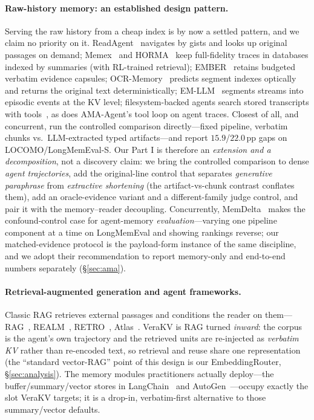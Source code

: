 \documentclass{article} %
\newcommand{\pp}{\,\mathrm{pp}}
\newcommand{\kvm}{VeraKV}
\begin{document}
\paragraph{Raw-history memory: an established design pattern.}
Serving the raw history from a cheap index is by now a settled pattern, and we
claim no priority on it. ReadAgent~\citep{readagent} navigates by gists and looks
up original passages on demand; Memex~\citep{memexrl} and HORMA~\citep{horma} keep
full-fidelity traces in databases indexed by summaries (with RL-trained retrieval);
EMBER~\citep{ember} retains budgeted verbatim evidence capsules;
OCR-Memory~\citep{ocrmemory} predicts segment indexes optically and returns the
original text deterministically; EM-LLM~\citep{emllm} segments streams into
episodic events at the KV level; filesystem-backed agents search stored transcripts
with tools~\citep{lettafiles,pamlocomo}, as does AMA-Agent's tool loop on agent
traces. Closest of all, and concurrent, \citet{verbatimchunks} run the controlled
comparison directly---fixed pipeline, verbatim chunks vs.\ LLM-extracted typed
artifacts---and report $15.9$/$22.0\pp$ gaps on LOCOMO/LongMemEval-S. Our Part I is
therefore an \emph{extension and a decomposition}, not a discovery claim: we bring
the controlled comparison to dense \emph{agent trajectories}, add the
original-line control that separates \emph{generative paraphrase} from
\emph{extractive shortening} (the artifact-vs-chunk contrast conflates them), add
an oracle-evidence variant and a different-family judge control, and pair it with
the memory--reader decoupling. Concurrently,
MemDelta~\citep{memdelta} makes the confound-control case for agent-memory
\emph{evaluation}---varying one pipeline component at a time on LongMemEval and
showing rankings reverse; our matched-evidence protocol is the payload-form
instance of the same discipline, and we adopt their recommendation to report
memory-only and end-to-end numbers separately (\S\ref{sec:ama}).

\paragraph{Retrieval-augmented generation and agent frameworks.}
Classic RAG retrieves external passages and conditions the reader on
them---RAG~\citep{rag}, REALM~\citep{realm}, RETRO~\citep{retro},
Atlas~\citep{atlas}. \kvm{} is RAG turned \emph{inward}: the corpus is the agent's
own trajectory and the retrieved units are re-injected as \emph{verbatim KV}
rather than re-encoded text, so retrieval and reuse share one representation
(the ``standard vector-RAG'' point of this design is our EmbeddingRouter,
\S\ref{sec:analysis}). The memory modules practitioners actually deploy---the
buffer/summary/vector stores in LangChain~\citep{langchain} and
AutoGen~\citep{autogen}---occupy exactly the slot \kvm{} targets; it is a
drop-in, verbatim-first alternative to those summary/vector defaults.
\end{document}
